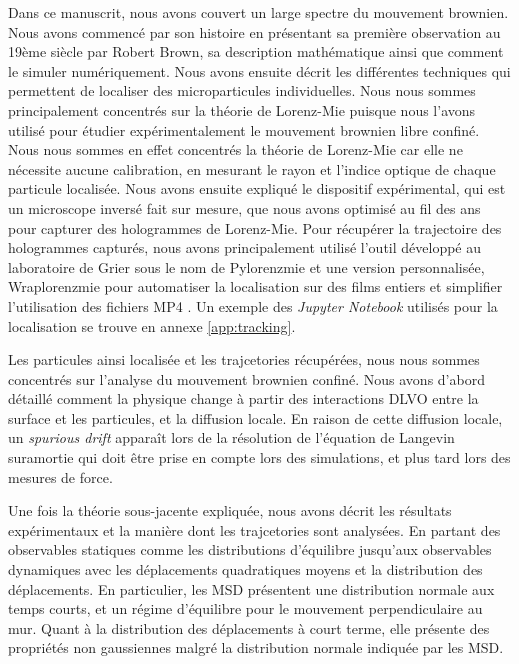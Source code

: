 Dans ce manuscrit, nous avons couvert un large spectre du mouvement brownien. Nous avons commencé par son histoire en présentant sa première observation au 19ème siècle par Robert Brown, sa description mathématique ainsi que comment le simuler numériquement. Nous avons ensuite décrit les différentes techniques qui permettent de localiser des microparticules individuelles. Nous nous sommes principalement concentrés sur la théorie de Lorenz-Mie puisque nous l'avons utilisé pour étudier expérimentalement le mouvement brownien libre confiné. Nous nous sommes en effet concentrés la théorie de Lorenz-Mie car elle ne nécessite aucune calibration, en mesurant le rayon et l'indice optique de chaque particule localisée. Nous avons ensuite expliqué le dispositif expérimental, qui est un microscope inversé fait sur mesure, que nous avons optimisé au fil des ans pour capturer des hologrammes de Lorenz-Mie. Pour récupérer la trajectoire des hologrammes capturés, nous avons principalement utilisé l'outil développé au laboratoire de Grier sous le nom de Pylorenzmie \href{https://github.com/davidgrier/pylorenzmie}{\faGithub} et une version personnalisée, Wraplorenzmie pour automatiser la localisation sur des films entiers et simplifier l'utilisation des fichiers MP4 \href{https://github.com/eXpensia/wraplorenzmie}{\faGithub}. Un exemple des \textit{Jupyter Notebook} utilisés pour la localisation se trouve en annexe \ref{app:tracking}.

Les particules ainsi localisée et les trajcetories récupérées, nous nous sommes concentrés sur l'analyse du mouvement brownien confiné. Nous avons d'abord détaillé comment la physique change à partir des interactions DLVO entre la surface et les particules, et la diffusion locale. En raison de cette diffusion locale, un \textit{spurious drift} apparaît lors de la résolution de l'équation de Langevin suramortie qui doit être prise en compte lors des simulations, et plus tard lors des mesures de force.

Une fois la théorie sous-jacente expliquée, nous avons décrit les résultats expérimentaux et la manière dont les trajcetories sont analysées. En partant des observables statiques comme les distributions d'équilibre jusqu'aux observables dynamiques avec les déplacements quadratiques moyens et la distribution des déplacements. En particulier, les \gls{MSD} présentent une distribution normale aux temps courts, et un régime d'équilibre pour le mouvement perpendiculaire au mur. Quant à la distribution des déplacements à court terme, elle présente des propriétés non gaussiennes malgré la distribution normale indiquée par les \gls{MSD}.

